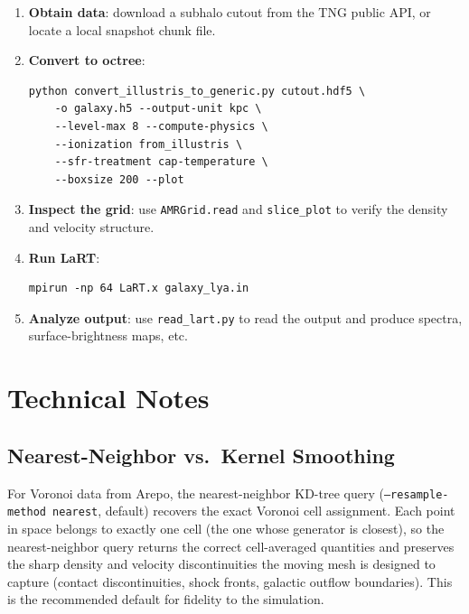 \documentclass[english,a4paper]{my_memo}
\begin{document}
\begin{enumerate}
\item \textbf{Obtain data}: download a subhalo cutout from the TNG
  public API, or locate a local snapshot chunk file.

\item \textbf{Convert to octree}:
\begin{lstlisting}[style=shellstyle]
python convert_illustris_to_generic.py cutout.hdf5 \
    -o galaxy.h5 --output-unit kpc \
    --level-max 8 --compute-physics \
    --ionization from_illustris \
    --sfr-treatment cap-temperature \
    --boxsize 200 --plot
\end{lstlisting}

\item \textbf{Inspect the grid}: use \texttt{AMRGrid.read} and
  \texttt{slice\_plot} to verify the density and velocity structure.

\item \textbf{Run LaRT}:
\begin{lstlisting}[style=shellstyle]
mpirun -np 64 LaRT.x galaxy_lya.in
\end{lstlisting}

\item \textbf{Analyze output}: use \texttt{read\_lart.py} to read the
  output and produce spectra, surface-brightness maps, etc.
\end{enumerate}


\section{Technical Notes}
\label{sec:notes}

\subsection{Nearest-Neighbor vs.\ Kernel Smoothing}

For Voronoi data from Arepo, the nearest-neighbor KD-tree query
(\texttt{--resample-method nearest}, default) recovers the exact
Voronoi cell assignment.  Each point in space belongs to exactly one
cell (the one whose generator is closest), so the nearest-neighbor
query returns the correct cell-averaged quantities and preserves the
sharp density and velocity discontinuities the moving mesh is designed
to capture (contact discontinuities, shock fronts, galactic outflow
boundaries).  This is the recommended default for fidelity to the
simulation.
\end{document}
